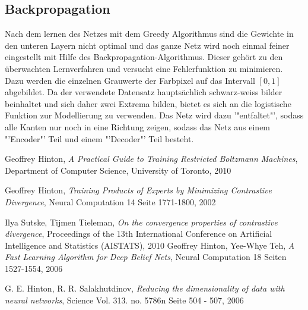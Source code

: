 \documentclass[12pt]{article}
\begin{document}
\subsection{Backpropagation}
Nach dem lernen des Netzes mit dem Greedy Algorithmus sind die Gewichte in den unteren Layern nicht optimal und das ganze Netz wird noch einmal feiner eingestellt mit Hilfe des Backpropagation-Algorithmus. Dieser gehört zu den überwachten Lernverfahren und versucht eine Fehlerfunktion zu minimieren. Dazu werden die einzelnen Grauwerte der Farbpixel auf das Intervall $[0,1]$ abgebildet. Da der verwendete Datensatz hauptsächlich schwarz-weiss bilder beinhaltet und sich daher zwei Extrema bilden, bietet es sich an die logistische Funktion zur Modellierung zu verwenden. Das Netz wird dazu '"entfaltet"', sodass alle Kanten nur noch in eine Richtung zeigen, sodass das Netz aus einem "'Encoder"' Teil und einem "'Decoder"' Teil besteht.\cite{backprop}

\begin{thebibliography}{9}

Geoffrey Hinton,
\emph{A Practical Guide to Training Restricted Boltzmann Machines},
Department of Computer Science, 
University of Toronto,
2010

Geoffrey Hinton,
\emph{Training Products of Experts by Minimizing Contrastive Divergence},
Neural Computation 14 Seite 1771-1800,
2002

Ilya Sutske, Tijmen Tieleman,
\emph{On the convergence properties of contrastive divergence},
Proceedings of the 13th International Conference on Artificial Intelligence and Statistics (AISTATS),
2010 
Geoffrey Hinton, Yee-Whye Teh,
\emph{A Fast Learning Algorithm for Deep Belief Nets},
Neural Computation 18 Seiten 1527-1554,
2006

G. E. Hinton, R. R. Salakhutdinov,
\emph{Reducing the dimensionality of data with neural networks},
Science Vol. 313. no. 5786n Seite 504 - 507,
2006

\end{thebibliography}
\end{document}

